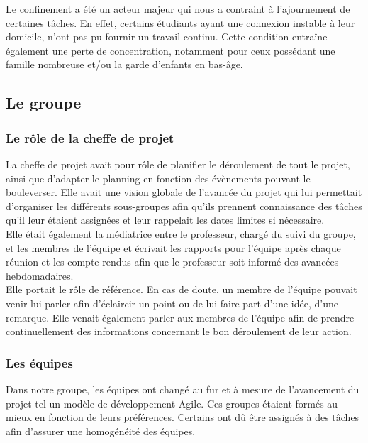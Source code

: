 \documentclass[a4paper,11pt]{article}
\begin{document}
    Le confinement a été un acteur majeur qui nous a contraint à l’ajournement de certaines tâches. En effet, certains étudiants ayant une connexion instable à leur domicile, n’ont pas pu fournir un travail continu. Cette condition entraîne également une perte de concentration, notamment pour ceux possédant une famille nombreuse et/ou la garde d’enfants en bas-âge.


\subsection{Le groupe}

\subsubsection{Le rôle de la cheffe de projet}

    La cheffe de projet avait pour rôle de planifier le déroulement de tout le projet, ainsi que d'adapter le planning en fonction des évènements pouvant le bouleverser. Elle avait une vision globale de l’avancée du projet qui lui permettait d’organiser les différents sous-groupes afin qu’ils prennent connaissance des tâches qu’il leur étaient assignées et  leur rappelait les dates limites si nécessaire. \\

    Elle était également la médiatrice entre le professeur, chargé du suivi du groupe, et les membres de l’équipe et écrivait les rapports pour l’équipe après chaque réunion et les compte-rendus afin que le professeur soit informé des avancées hebdomadaires. \\
	
    Elle portait le rôle de référence. En cas de doute, un membre de l’équipe pouvait venir lui parler afin d’éclaircir un point ou de lui faire part d’une idée, d’une remarque. Elle venait également parler aux membres de l’équipe afin de prendre continuellement des informations concernant le bon déroulement de leur action.

\subsubsection{Les équipes}


    Dans notre groupe, les équipes ont changé au fur et à mesure de l’avancement du projet tel un modèle de développement Agile. Ces groupes étaient formés au mieux en fonction de leurs préférences. Certains ont dû être assignés à des tâches afin d’assurer une homogénéité des équipes. \\
\end{document}
